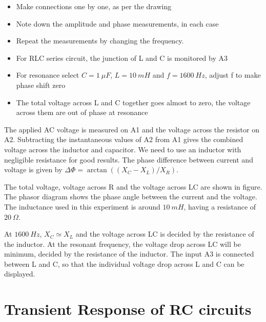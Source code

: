 \documentclass[a4paper,12pt,english]{sphinxmanual}
\begin{document}
\begin{itemize}
\item {} 
Make connections one by one, as per the drawing

\item {} 
Note down the amplitude and phase measurements, in each case

\item {} 
Repeat the measurements by changing the frequency.

\item {} 
For RLC series circuit, the junction of L and C is monitored by A3

\item {} 
For resonance select \(C = 1~\mu F\), \(L = 10~mH\) and \(f = 1600~Hz\), adjust f to
make phase shift zero

\item {} 
The total voltage across L and C together goes almost to zero, the
voltage across them are out of phase at resonance

\end{itemize}


The applied AC voltage is measured on A1 and the voltage across the
resistor on A2. Subtracting the instantaneous values of A2 from A1 gives
the combined voltage across the inductor and capacitor. We need to use
an inductor with negligible resistance for good results. The phase
difference between current and voltage is given by
\(\Delta \Phi = \arctan((X_C - X_L)/X_R)\).

The total voltage, voltage across R and the voltage across LC are shown
in figure. The phasor diagram shows the phase angle between the current
and the voltage. The inductance used in this experiment is around \(10~mH\),
having a resistance of \(20~\Omega\).

At \(1600~Hz\), \(X_C \simeq X_L\) and the voltage across LC is decided by the
resistance of the inductor. At the resonant frequency, the voltage drop
across LC will be minimum, decided by the resistance of the inductor.
The input A3 is connected between L and C, so that the individual
voltage drop across L and C can be displayed.


\section{Transient Response of RC circuits}
\label{\detokenize{4.4:transient-response-of-rc-circuits}}\label{\detokenize{4.4::doc}}
\end{document}

